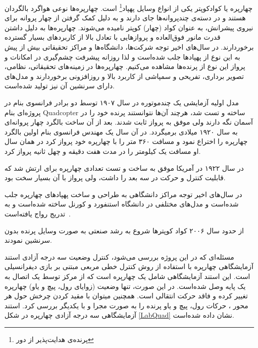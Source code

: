


چهارپره یا کوادکوپتر یکی از انواع وسایل پهپاد\footnote{پرنده‌ی هدایت‌پذیر از دور} است. چهارپره‌ها نوعی هواگرد بالگردان هستند و در دسته‌ی چندپروانه‌ها جای دارند و به دلیل کمک گرفتن از چهار پروانه برای نیروی پیشرانش، به عنوان کواد (چهار) کوپتر نامیده می‌شوند. چهارپره‌ها به دلیل داشتن قدرت مانور فوق‌العاده و پروازهایی با تعادل بالا از کاربردهای بسیار گسترده برخوردارند.
در سال‌های اخیر توجه شرکت‌ها، دانشگاه‌ها و مراکز تحقیقاتی بیش از پیش به این نوع از پهپادها جلب شده‌است و لذا روزانه پیشرفت چشم‌گیری در امکانات و پرواز این نوع از پرنده‌ها مشاهده می‌کنیم. چهارپره‌ها در زمینه‌های تحقیقاتی، نظامی، تصویر برداری، تفریحی و سمپاشی از کاربرد بالا و روزافزونی برخوردارند و مدل‌های دارای سرنشین آن نیز تولید شده‌است.





مدل‬ اولیه آزمایشی یک چندموتوره در سال ۱۹۰۷ توسط دو برادر فرانسوی بنام  در پروژه‌ای بنام Quadcopter ساخته و تست شد، هرچند آن‌ها نتوانستند پرنده خود را در آسمان نگه دارند ولی موفق به پرواز ثابت شدند. بعد از آن ساخت بالگرد چهار پروانه‌ای به سال ۱۹۲۰ میلادی برمیگردد. در آن سال یک مهندس فرانسوی بنام  اولین بالگرد چهارپره را اختراع نمود و مسافت ۳۶۰ متر را با چهارپره خود پرواز کرد در همان سال او مسافت یک کیلومتر را در مدت هفت دقیقه و چهل ثانیه پرواز کرد.

در  سال ۱۹۲۲ در آمریکا  موفق به ساخت و تست تعدادی چهارپره برای ارتش شد که قابلیت کنترل و حرکت در سه بعد را داشت، ولی پرواز با آن بسیار سخت بود.

در سال‌های اخیر توجه مراکز دانشگاهی به طراحی و ساخت پهپادهای چهارپره جلب شده‌است و مدل‌های مختلفی در دانشگاه استنفورد و کورنل ساخته شده‌است و به تدریج رواج یافته‌است~\cite{5717652}.

از حدود سال ۲۰۰۶ کواد کوپترها شروع به رشد صنعتی به صورت وسایل پرنده بدون سرنشین نمودند.


مسئله‌ای که در این پروژه بررسی می‌شود، کنترل وضعیت سه درجه آزادی استند آزمایشگاهی چهارپره با استفاده از روش کنترل خطی مربعی مبتنی بر بازی دیفرانسیلی است. این استند آزمایشگاهی شامل یک چهارپره است که از 
مرکز توسط یک اتصال به یک پایه وصل شده‌است. در این صورت، تنها وضعیت (زوایای رول، پیچ و یاو) 
چهارپره تغییر کرده و فاقد حرکت انتقالی است. همچنین میتوان با مقید کردن چرخش حول هر محور ، 
حرکات رول، پیچ و یاو  پرنده را به صورت مجرا و با یکدیگر بررسی کرد.
استند آزمایشگاهی سه درجه آزادی چهارپره در شکل \ref{LabQuad} نشان داده شده‌است.

